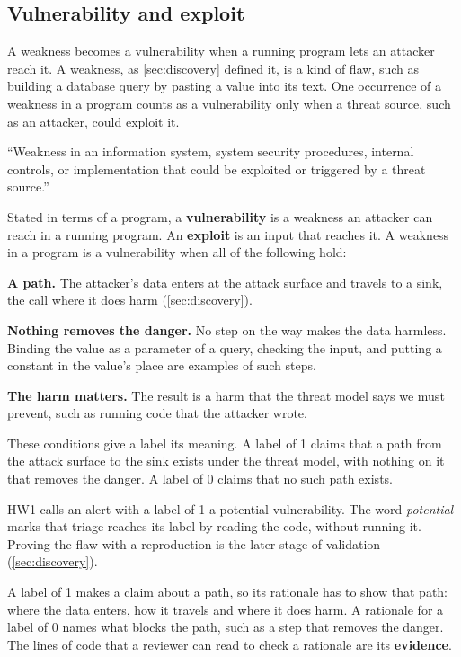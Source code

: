 \subsection{Vulnerability and exploit}
\label{sec:triage-vulnerability}

A weakness becomes a vulnerability when a running program lets an attacker reach it. A weakness, as
\cref{sec:discovery} defined it, is a kind of flaw, such as building a database query by pasting a
value into its text. One occurrence of a weakness in a program counts as a vulnerability only when
a threat source, such as an attacker, could exploit it.

\begin{definition}[Vulnerability]
\label{def:triage-vulnerability}
``Weakness in an information system, system security procedures, internal controls, or
implementation that could be exploited or triggered by a threat source.''
\citep{nist-glossary-vulnerability}
\end{definition}

Stated in terms of a program, a \textbf{vulnerability} is a weakness an attacker can reach in a
running program. An \textbf{exploit} is an input that reaches it. A weakness in a program is a
vulnerability when all of the following hold:
\bi
\item \textbf{A path.} The attacker's data enters at the attack surface and travels to a sink, the
call where it does harm (\cref{sec:discovery}).
\item \textbf{Nothing removes the danger.} No step on the way makes the data harmless. Binding the
value as a parameter of a query, checking the input, and putting a constant in the value's place are
examples of such steps.
\item \textbf{The harm matters.} The result is a harm that the threat model says we must prevent,
such as running code that the attacker wrote.
\ei

These conditions give a label its meaning. A label of 1 claims that a path from the attack surface
to the sink exists under the threat model, with nothing on it that removes the danger. A label of 0
claims that no such path exists.

HW1 calls an alert with a label of 1 a potential vulnerability. The word \emph{potential} marks that
triage reaches its label by reading the code, without running it. Proving the flaw with a
reproduction is the later stage of validation (\cref{sec:discovery}).

A label of 1 makes a claim about a path, so its rationale has to show that path: where the data
enters, how it travels and where it does harm. A rationale for a label of 0 names what blocks the
path, such as a step that removes the danger. The lines of code that a reviewer can read to check a
rationale are its \textbf{evidence}.

